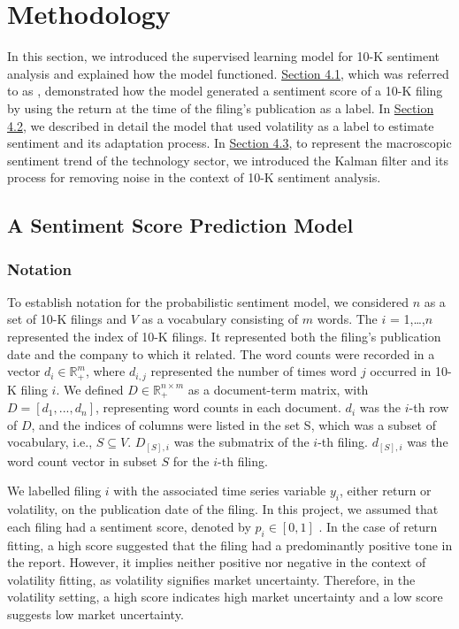 \documentclass[logo,bsc,singlespacing,parskip]{infthesis}
\begin{document}
\chapter{Methodology}
In this section, we introduced the supervised learning model for 10-K sentiment analysis and explained how the model functioned. \hyperref[sec:sentiment_model]{Section 4.1}, which was referred to as \cite{ke2020predicting}, demonstrated how the model generated a sentiment score of a 10-K filing by using the return at the time of the filing’s publication as a label. In \hyperref[sec:volatility_label]{Section 4.2}, we described in detail the model that used volatility as a label to estimate sentiment and its adaptation process. In \hyperref[sec:kalman_filter]{Section 4.3}, to represent the macroscopic sentiment trend of the technology sector, we introduced the Kalman filter and its process for removing noise in the context of 10-K sentiment analysis. 

\section{A Sentiment Score Prediction Model}
\label{sec:sentiment_model}
\subsection{Notation}
To establish notation for the probabilistic sentiment model, we considered $n$ as a set of 10-K filings and $V$ as a vocabulary consisting of $m$ words. The $i$ = 1,…,$n$ represented the index of 10-K filings. It represented both the filing’s publication date and the company to which it related. The word counts were recorded in a vector $d_i \in \mathbb{R}^m_+$, where $d_{i,j}$ represented the number of times word $j$ occurred in 10-K filing $i$. We defined $D \in \mathbb{R}^{n \times m}_+$ as a document-term matrix, with $D = [d_1, ..., d_n]$, representing word counts in each document. $d_i$ was the  $i$-th row of $D$, and the indices of columns were listed in the set S, which was a subset of vocabulary, i.e., $S \subseteq V$. $D_{[S],i}$ was the submatrix of the $i$-th filing. $d_{[S],i}$ was the word count vector in subset $S$ for the $i$-th filing.

We labelled filing $i$ with the associated time series variable $y_i$, either return or volatility, on the publication date of the filing. In this project, we assumed that each filing had a sentiment score, denoted by $p_i \in [0,1]$
. In the case of return fitting, a high score suggested that the filing had a predominantly positive tone in the report. However, it implies neither positive nor negative in the context of volatility fitting, as volatility signifies market uncertainty. Therefore, in the volatility setting, a high score indicates high market uncertainty and a low score suggests low market uncertainty.
\end{document}
